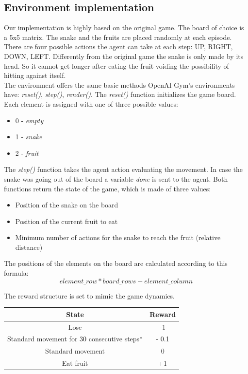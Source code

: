 \documentclass[conference]{IEEEtran}
\begin{document}
\subsection{Environment implementation}
Our implementation is highly based on the original game. The board of choice is a 5x5 matrix. The snake and the fruits are placed randomly at each episode. There are
four possible actions the agent can take at each step: UP, RIGHT, DOWN, LEFT. Differently from the original game the snake is only made by its head. So it cannot get
longer after eating the fruit voiding the possibility of hitting against itself. \\
The environment offers the same basic methods OpenAI Gym's environments have: \textit{reset()}, \textit{step()}, \textit{render()}. The \textit{reset()} function
initializes the game board. Each element is assigned with one of three possible values:
\begin{itemize}
    \item 0 - \textit{empty}
    \item 1 - \textit{snake}
    \item 2 - \textit{fruit}
\end{itemize}
The \textit{step()} function takes the agent action evaluating the movement. In case the snake was going out of the board a variable \textit{done} is sent to the agent.
Both functions return the state of the game, which is made of three values:
\begin{itemize}
    \item Position of the snake on the board
    \item Position of the current fruit to eat
    \item Minimum number of actions for the snake to reach the fruit (relative distance)
\end{itemize}
The positions of the elements on the board are calculated according to this formula:
\[ element\_row * board\_rows + element\_column \]

The reward structure is set to mimic the game dynamics.
\begin{center}
\begin{tabular}{| c | c |}
    \hline
    \textbf{State} & \textbf{Reward} \\
    \hline\hline
    Lose & -1 \\
    \hline
    Standard movement for 30 consecutive steps* & - 0.1 \\
    \hline
    Standard movement & 0 \\
    \hline
    Eat fruit & +1 \\
    \hline
\end{tabular}
\end{center}
\end{document}
